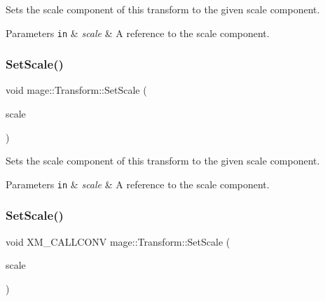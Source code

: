 Sets the scale component of this transform to the given scale component.


\begin{DoxyParams}[1]{Parameters}
\mbox{\tt in}  & {\em scale} & A reference to the scale component. \\
\hline
\end{DoxyParams}
\hypertarget{classmage_1_1_transform_a06ec78f9239c0f0663638359f4f3c3b8}{}\label{classmage_1_1_transform_a06ec78f9239c0f0663638359f4f3c3b8} 
\subsubsection{\texorpdfstring{Set\+Scale()}{SetScale()}\hspace{0.1cm}{\footnotesize\ttfamily [4/5]}}
{\footnotesize\ttfamily void mage\+::\+Transform\+::\+Set\+Scale (\begin{DoxyParamCaption}\item[{X\+M\+F\+L\+O\+A\+T3 \&\&}]{scale }\end{DoxyParamCaption})\hspace{0.3cm}{\ttfamily [noexcept]}}

Sets the scale component of this transform to the given scale component.


\begin{DoxyParams}[1]{Parameters}
\mbox{\tt in}  & {\em scale} & A reference to the scale component. \\
\hline
\end{DoxyParams}
\hypertarget{classmage_1_1_transform_a7dd2ca0ee43f956f1a6db79f83c14983}{}\label{classmage_1_1_transform_a7dd2ca0ee43f956f1a6db79f83c14983} 
\subsubsection{\texorpdfstring{Set\+Scale()}{SetScale()}\hspace{0.1cm}{\footnotesize\ttfamily [5/5]}}
{\footnotesize\ttfamily void X\+M\+\_\+\+C\+A\+L\+L\+C\+O\+NV mage\+::\+Transform\+::\+Set\+Scale (\begin{DoxyParamCaption}\item[{F\+X\+M\+V\+E\+C\+T\+OR}]{scale }\end{DoxyParamCaption})\hspace{0.3cm}{\ttfamily [noexcept]}}

